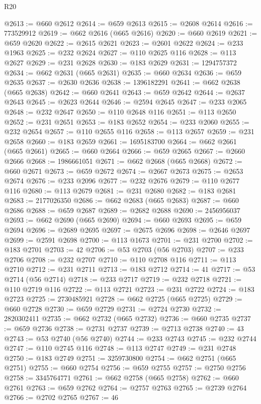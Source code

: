 \begin{lexlean}{R20}
\begin{coremodule}
@2613 := @660 @2612
@2614 := @659 @2613
@2615 := @2608 @2614
@2616 := 773529912
@2619 := @662 @2616 (@665 @2616)
@2620 := @660 @2619
@2621 := @659 @2620
@2622 := @2615 @2621
@2623 := @2601 @2622
@2624 := @233 @1963
@2625 := @232 @2624
@2627 := @110 @2625 @116
@2628 := @113 @2627
@2629 := @231 @2628
@2630 := @183 @2629
@2631 := 1294757372
@2634 := @662 @2631 (@665 @2631)
@2635 := @660 @2634
@2636 := @659 @2635
@2637 := @2630 @2636
@2638 := 1396182291
@2641 := @662 @2638 (@665 @2638)
@2642 := @660 @2641
@2643 := @659 @2642
@2644 := @2637 @2643
@2645 := @2623 @2644
@2646 := @2594 @2645
@2647 := @233 @2065
@2648 := @232 @2647
@2650 := @110 @2648 @116
@2651 := @113 @2650
@2652 := @231 @2651
@2653 := @183 @2652
@2654 := @233 @2060
@2655 := @232 @2654
@2657 := @110 @2655 @116
@2658 := @113 @2657
@2659 := @231 @2658
@2660 := @183 @2659
@2661 := 1695183700
@2664 := @662 @2661 (@665 @2661)
@2665 := @660 @2664
@2666 := @659 @2665
@2667 := @2660 @2666
@2668 := 1986661051
@2671 := @662 @2668 (@665 @2668)
@2672 := @660 @2671
@2673 := @659 @2672
@2674 := @2667 @2673
@2675 := @2653 @2674
@2676 := @233 @2096
@2677 := @232 @2676
@2679 := @110 @2677 @116
@2680 := @113 @2679
@2681 := @231 @2680
@2682 := @183 @2681
@2683 := 2177026350
@2686 := @662 @2683 (@665 @2683)
@2687 := @660 @2686
@2688 := @659 @2687
@2689 := @2682 @2688
@2690 := 2456956037
@2693 := @662 @2690 (@665 @2690)
@2694 := @660 @2693
@2695 := @659 @2694
@2696 := @2689 @2695
@2697 := @2675 @2696
@2698 := @2646 @2697
@2699 := @2591 @2698
@2700 := @113 @1673
@2701 := @231 @2700
@2702 := @183 @2701
@2703 := 42
@2706 := @53 @2703 (@56 @2703)
@2707 := @233 @2706
@2708 := @232 @2707
@2710 := @110 @2708 @116
@2711 := @113 @2710
@2712 := @231 @2711
@2713 := @183 @2712
@2714 := 41
@2717 := @53 @2714 (@56 @2714)
@2718 := @233 @2717
@2719 := @232 @2718
@2721 := @110 @2719 @116
@2722 := @113 @2721
@2723 := @231 @2722
@2724 := @183 @2723
@2725 := 2730485921
@2728 := @662 @2725 (@665 @2725)
@2729 := @660 @2728
@2730 := @659 @2729
@2731 := @2724 @2730
@2732 := 2820302411
@2735 := @662 @2732 (@665 @2732)
@2736 := @660 @2735
@2737 := @659 @2736
@2738 := @2731 @2737
@2739 := @2713 @2738
@2740 := 43
@2743 := @53 @2740 (@56 @2740)
@2744 := @233 @2743
@2745 := @232 @2744
@2747 := @110 @2745 @116
@2748 := @113 @2747
@2749 := @231 @2748
@2750 := @183 @2749
@2751 := 3259730800
@2754 := @662 @2751 (@665 @2751)
@2755 := @660 @2754
@2756 := @659 @2755
@2757 := @2750 @2756
@2758 := 3345764771
@2761 := @662 @2758 (@665 @2758)
@2762 := @660 @2761
@2763 := @659 @2762
@2764 := @2757 @2763
@2765 := @2739 @2764
@2766 := @2702 @2765
@2767 := 46

\end{coremodule}
\end{lexlean}
